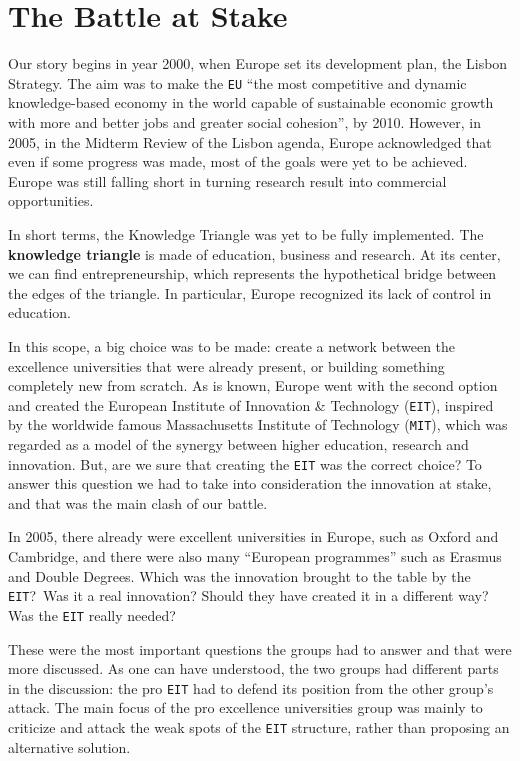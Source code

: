 \documentclass[11pt,a4paper,oneside,twocolumn]{IEEEtran}
\begin{document}
\section{The Battle at Stake}
Our story begins in year 2000, when Europe set its development plan, the Lisbon Strategy. The aim was to make the \texttt{EU} ``the most competitive and dynamic knowledge-based economy in the world capable of sustainable economic growth with more and better jobs and greater social cohesion''\cite{3_1}, by 2010. However, in 2005, in the Midterm Review of the Lisbon agenda, Europe acknowledged that even if some progress was made, most of the goals were yet to be achieved. Europe was still falling short in turning research result into commercial opportunities.

In short terms, the Knowledge Triangle was yet to be fully implemented. The \textbf{knowledge triangle} is made of education, business and research. At its center, we can find entrepreneurship, which represents the hypothetical bridge between the edges of the triangle. In particular, Europe recognized its lack of control in education.

In this scope, a big choice was to be made: create a network between the excellence universities that were already present, or building something completely new from scratch. As is known, Europe went with the second option and created the European Institute of Innovation \& Technology (\texttt{EIT}), inspired by the worldwide famous Massachusetts Institute of Technology (\texttt{MIT}), which was regarded as a model of the synergy between higher education, research and innovation. But, are we sure that creating the \texttt{EIT} was the correct choice? To answer this question we had to take into consideration the innovation at stake, and that was the main clash of our battle.

In 2005, there already were excellent universities in Europe, such as Oxford and Cambridge, and there were also many ``European programmes'' such as Erasmus and Double Degrees.
Which was the innovation brought to the table by the \texttt{EIT}?\ Was it a real innovation? Should they have created it in a different way? Was the \texttt{EIT} really needed?

These were the most important questions the groups had to answer and that were more discussed. As one can have understood, the two groups had different parts in the discussion: the pro \texttt{EIT} had to defend its position from the other group's attack. The main focus of the pro excellence universities group was mainly to criticize and attack the weak spots of the \texttt{EIT} structure, rather than proposing an alternative solution.
\end{document}
